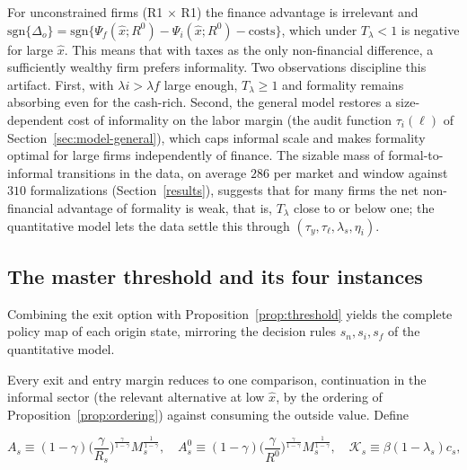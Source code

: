 \documentclass[12pt]{article}
\begin{document}
\begin{remark}
\label{rem:toy-rich}
For unconstrained firms (R1 $\times$ R1) the finance advantage is irrelevant and $\text{sgn} \{\Delta_{o}\} = \text{sgn}\{\Psi_{f}(\hat x;R^0) -\Psi_{i}(\hat x;R^0)-\text{costs}\}$, which under $T_{\lambda}<1$ is negative for large $\hat x$. This means that with taxes as the only non-financial difference, a sufficiently wealthy firm prefers informality. Two observations discipline this artifact. First, with $\lambda{i}>\lambda{f}$ large enough, $T_{\lambda}\geq1$ and formality remains absorbing even for the cash-rich. Second, the general model restores a size-dependent cost of informality on the labor margin (the audit function $\tau_{i}(\ell)$ of Section~\ref{sec:model-general}), which caps informal scale and makes formality optimal for large firms independently of finance. The sizable mass of formal-to-informal transitions in the data, on average $286$ per market and window against $310$ formalizations (Section~\ref{results}), suggests that for many firms the net non-financial advantage of formality is weak, that is, $T_{\lambda}$ close to or below one; the quantitative model lets the data settle this through $(\tau_{y},\tau_{\ell},\lambda_{s},\eta_{i})$.
\end{remark}

\subsection{The master threshold and its four instances}

Combining the exit option with Proposition~\ref{prop:threshold} yields the complete policy map of each origin state, mirroring the decision rules $s_{n},s_{i},s_{f}$ of the quantitative model. 

Every exit and entry margin reduces to one comparison, continuation in the informal sector (the relevant alternative at low $\hat x$, by the ordering of Proposition~\ref{prop:ordering}) against consuming the outside value. Define

\begin{equation}
  A_{s}\equiv(1-\gamma)\Big(\frac{\gamma}{R_{s}}\Big)^{\frac{\gamma}{1-\gamma}}
  M_{s}^{\frac{1}{1-\gamma}},\quad
  A^{0}_{s}\equiv(1-\gamma)\Big(\frac{\gamma}{R^0}\Big)^{\frac{\gamma}{1-\gamma}}
  M_{s}^{\frac{1}{1-\gamma}},\quad
  \mathcal{K}_{s}\equiv\beta(1-\lambda_{s})c_{s},
  \label{eq:toy-Anot}
\end{equation}
\end{document}
